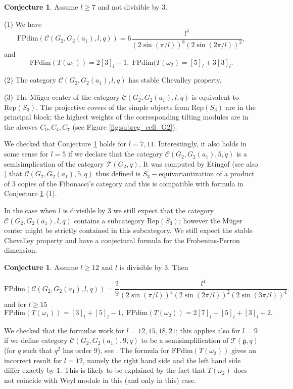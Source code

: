 \documentclass{amsart}
\theoremstyle{definition}
\newtheorem{conjecture}[theorem]{Conjecture}
\newcommand{\C}{\mathcal{C}}
\newcommand{\g}{\mathfrak{g}}
\newcommand{\T}{\mathcal{T}}
\newcommand{\FP}{\text{FPdim}}
\newcommand{\Rep}{\text{Rep}}
\numberwithin{equation}{section}
\begin{document}
\begin{conjecture}\label{g2conj}
    Assume $l\ge 7$ and not divisible by 3.

    (1) We have
    $$\FP(\C(G_2, G_2(a_1),l,q))=6\frac{l^4}{(2\sin(\pi/l))^8(2\sin(2\pi/l))^2},$$
    and 
    $$\FP(T(\omega_1))=2[3]_l+1,\; \FP(T(\omega_2)=[5]_l+3[3]_l.$$

    (2) The category $\C(G_2, G_2(a_1),l,q)$ has stable Chevalley property.

    (3) The M\"uger center of the category $\C(G_2, G_2(a_1),l,q)$ is equivalent
    to $\Rep(S_3)$. The projective covers of the simple objects from $\Rep(S_3)$ are
    in the principal block; the highest weights of the corresponding tilting modules
    are in the alcoves $C_0, C_4, C_7$ (see Figure \ref{fig:subreg_cell_G2}).
\end{conjecture}

We checked that Conjecture \ref{g2conj} holds for $l=7,11$. Interestingly, it also holds
in some sense for $l=5$ if we declare that the category $\C(G_2, G_2(a_1),5,q)$
is a semisimplication of the category $\T(G_2,q)$. It was computed by Etingof
(see also \cite{RW})
that $\C(G_2, G_2(a_1),5,q)$ thus defined is $S_3-$equivariantization of a product
of 3 copies of the Fibonacci's category and this is compatible with formula
in Conjecture \ref{g2conj} (1). 

In the case when $l$ is divisible by 3 we still expect that the category
$\C(G_2, G_2(a_1),l,q)$ contains a subcategory $\Rep(S_3)$; however the M\"uger center
might be strictly contained in this subcategory. We still expect the stable Chevalley property and have a conjectural formula
for the Frobenius-Perron dimension:

\begin{conjecture}\label{g2conjm}
    Assume $l\ge 12$ and $l$ is divisible by 3. Then

    $$\FP(\C(G_2, G_2(a_1),l,q))=\frac29\frac{l^4}{(2\sin(\pi/l))^4(2\sin(2\pi/l))^2(2\sin(3\pi/l))^4}.$$
and for $l\ge 15$
$$\FP(T(\omega_1))=[3]_l+[5]_l-1,\; \FP(T(\omega_2))=2[7]_l-[5]_l+[3]_l+2.$$
\end{conjecture}

We checked that the formulas work for $l=12,15,18,21$; this applies also for $l=9$ if we
define category $\C(G_2, G_2(a_1),9,q)$ to be a semisimplification of $\T(\g,q)$
(for $q$ such that $q^2$ has order 9), see \cite{RW}. The formula for $\FP(T(\omega_2))$ gives
an incorrect result for $l=12$, namely the right hand side and the left hand side
differ exactly by 1. This is likely to be explained by the fact that $T(\omega_2)$
does not coincide with Weyl module in this (and only in this) case.
\end{document}
